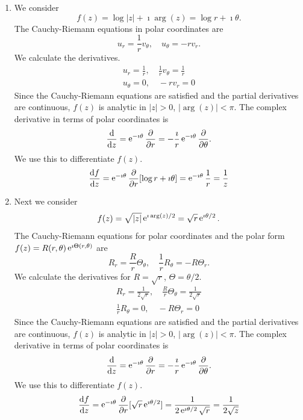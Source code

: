 {%
\begin{Solution}
  \label{solution log square root}
  \begin{enumerate}
  \item
    We consider
    \[
    f(z) = \log |z| + \imath \arg(z) = \log r + \imath \theta.
    \]
    The Cauchy-Riemann equations in polar coordinates are
    \[
    u_r = \frac{1}{r} v_\theta, \quad u_\theta = - r v_r.
    \]
    We calculate the derivatives.
    \begin{gather*}
      u_r = \frac{1}{r}, \quad \frac{1}{r} v_\theta = \frac{1}{r} 
      \\
      u_\theta = 0, \quad -r v_r = 0
    \end{gather*}
    Since the Cauchy-Riemann equations are satisfied and the partial
    derivatives are continuous, $f(z)$ is analytic in $|z| > 0$,
    $|\arg(z)| < \pi$.  The complex derivative in terms of polar
    coordinates is
    \[
    \frac{\mathrm{d}}{\mathrm{d} z} = \mathop{\mathrm{e}}\nolimits^{-\imath \theta} \frac{\partial}{\partial r} 
    = - \frac{\imath}{r} \mathop{\mathrm{e}}\nolimits^{-\imath \theta} \frac{\partial}{\partial \theta}.
    \]
    We use this to differentiate $f(z)$.
    \[
    \frac{\mathrm{d} f}{\mathrm{d} z} = \mathop{\mathrm{e}}\nolimits^{-\imath \theta} \frac{\partial}{\partial r}[ \log r + \imath \theta ]
    = \mathop{\mathrm{e}}\nolimits^{-\imath \theta} \frac{1}{r} = \frac{1}{z}
    \]
  \item
    Next we consider
    \[
    f(z) = \sqrt{|z|} \mathop{\mathrm{e}}\nolimits^{\imath \arg(z)/2} = \sqrt{r} \mathop{\mathrm{e}}\nolimits^{\imath \theta / 2}.
    \]
    The Cauchy-Riemann equations for polar coordinates and the polar form 
    $f(z) = R(r, \theta) \mathop{\mathrm{e}}\nolimits^{\imath \Theta(r, \theta)}$ are
    \[
    R_r = \frac{R}{r} \Theta_\theta, \quad \frac{1}{r} R_\theta = - R \Theta_r.
    \]
    We calculate the derivatives for $R = \sqrt{r}$, $\Theta = \theta / 2$.
    \begin{gather*}
      R_r = \frac{1}{2 \sqrt{r}}, \quad 
      \frac{R}{r} \Theta_\theta = \frac{1}{2 \sqrt{r}} 
      \\
      \frac{1}{r} R_\theta = 0, \quad - R \Theta_r = 0
    \end{gather*}
    Since the Cauchy-Riemann equations are satisfied and the partial
    derivatives are continuous, $f(z)$ is analytic in $|z| > 0$,
    $|\arg(z)| < \pi$.  The complex derivative in terms of polar
    coordinates is
    \[
    \frac{\mathrm{d}}{\mathrm{d} z} = \mathop{\mathrm{e}}\nolimits^{-\imath \theta} \frac{\partial}{\partial r} 
    = - \frac{\imath}{r} \mathop{\mathrm{e}}\nolimits^{-\imath \theta} \frac{\partial}{\partial \theta}.
    \]
    We use this to differentiate $f(z)$.
    \[
    \frac{\mathrm{d} f}{\mathrm{d} z} = \mathop{\mathrm{e}}\nolimits^{-\imath \theta} \frac{\partial}{\partial r}[ \sqrt{r} \mathop{\mathrm{e}}\nolimits^{\imath \theta / 2} ]
    = \frac{1}{2 \mathop{\mathrm{e}}\nolimits^{\imath \theta / 2} \sqrt{r}} = \frac{1}{2 \sqrt{z}}
    \]
  \end{enumerate}
\end{Solution}















}
